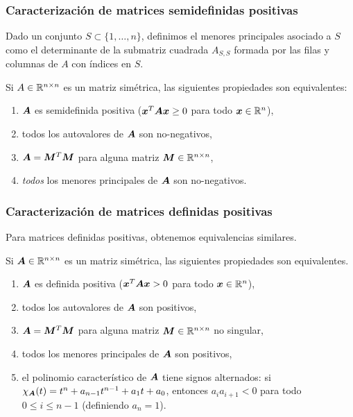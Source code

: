 \documentclass[aspectratio=169,12pt,spanish]{beamer}
\begin{document}
\begin{frame}
\frametitle{Caracterización de matrices semidefinidas positivas}

Dado un conjunto $S \subset \{1, \dots, n\}$, definimos el menores principales asociado a $S$ como el determinante de la submatriz cuadrada  $A_{S,S}$ formada por las filas y columnas de $A$ con índices en $S$.

\begin{theorem}
  Si $A \in \mathbb{R}^{n\times n}$ es un matriz simétrica, las siguientes propiedades son equivalentes:
  \begin{enumerate}
  \item $\bm{A}$ es semidefinida positiva ($\bm{x}^T \bm{A} \bm{x} \ge 0$ para todo $\bm{x} \in \mathbb{R}^n$),
  \item todos los autovalores de $\bm{A}$ son no-negativos,
  \item $\bm{A} = \bm{M}^T \bm{M}$ para alguna matriz $\bm{M} \in \mathbb{R}^{n \times n}$,
  \item \emph{todos} los menores principales de $\bm{A}$ son no-negativos.
  \end{enumerate}
\end{theorem}

\end{frame}


\begin{frame}
\frametitle{Caracterización de matrices definidas positivas}

Para matrices definidas positivas, obtenemos equivalencias similares.

\begin{theorem}
  Si $\bm{A} \in \mathbb{R}^{n\times n}$ es un matriz simétrica, las siguientes propiedades son equivalentes.
  \begin{enumerate}
  \item $\bm{A}$ es definida positiva ($\bm{x}^T \bm{A} \bm{x} > 0$ para todo $\bm{x} \in \mathbb{R}^n$),
  \item todos los autovalores de $\bm{A}$ son positivos,
  \item \label{MTM} $\bm{A} = \bm{M}^T \bm{M}$ para alguna matriz $\bm{M} \in \mathbb{R}^{n \times n}$ no singular,
  \item \label{menoresprincipales} todos los menores principales de $\bm{A}$ son positivos,
  \item el polinomio característico de $\bm{A}$ tiene signos alternados: si $\chi_{\bm{A}}(t) = t^n + a_{n-1} t^{n-1} + a_1 t + a_0$, entonces $a_i a_{i+1} < 0$ para todo $0 \le i \le {n-1}$ (definiendo $a_n = 1$).
  \end{enumerate}
\end{theorem}

\end{frame}
\end{document}
